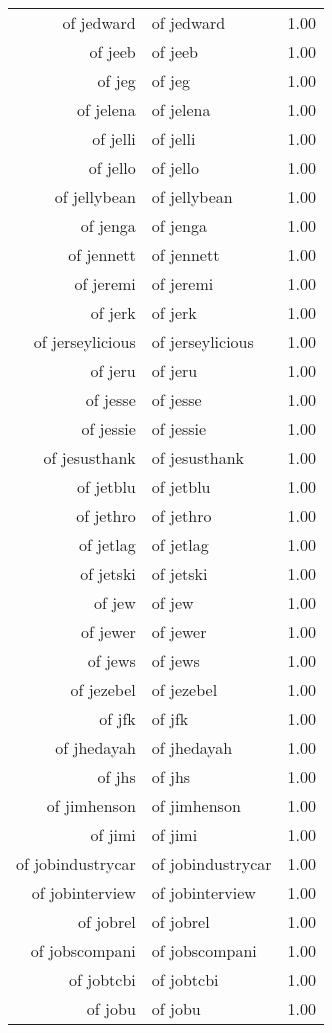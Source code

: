 \begin{table}[ht]
\begin{tabular}{rlr}
  of jedward & of jedward & 1.00 \\ 
  of jeeb & of jeeb & 1.00 \\ 
  of jeg & of jeg & 1.00 \\ 
  of jelena & of jelena & 1.00 \\ 
  of jelli & of jelli & 1.00 \\ 
  of jello & of jello & 1.00 \\ 
  of jellybean & of jellybean & 1.00 \\ 
  of jenga & of jenga & 1.00 \\ 
  of jennett & of jennett & 1.00 \\ 
  of jeremi & of jeremi & 1.00 \\ 
  of jerk & of jerk & 1.00 \\ 
  of jerseylicious & of jerseylicious & 1.00 \\ 
  of jeru & of jeru & 1.00 \\ 
  of jesse & of jesse & 1.00 \\ 
  of jessie & of jessie & 1.00 \\ 
  of jesusthank & of jesusthank & 1.00 \\ 
  of jetblu & of jetblu & 1.00 \\ 
  of jethro & of jethro & 1.00 \\ 
  of jetlag & of jetlag & 1.00 \\ 
  of jetski & of jetski & 1.00 \\ 
  of jew & of jew & 1.00 \\ 
  of jewer & of jewer & 1.00 \\ 
  of jews & of jews & 1.00 \\ 
  of jezebel & of jezebel & 1.00 \\ 
  of jfk & of jfk & 1.00 \\ 
  of jhedayah & of jhedayah & 1.00 \\ 
  of jhs & of jhs & 1.00 \\ 
  of jimhenson & of jimhenson & 1.00 \\ 
  of jimi & of jimi & 1.00 \\ 
  of jobindustrycar & of jobindustrycar & 1.00 \\ 
  of jobinterview & of jobinterview & 1.00 \\ 
  of jobrel & of jobrel & 1.00 \\ 
  of jobscompani & of jobscompani & 1.00 \\ 
  of jobtcbi & of jobtcbi & 1.00 \\ 
  of jobu & of jobu & 1.00 \\ 

\end{tabular}
\end{table}
